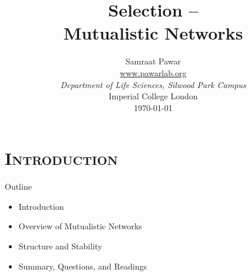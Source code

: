 





{
\begin{frame}[plain]

  \vspace{100pt}
  \title{\bf Selection -- \\Mutualistic Networks}

\author{
	Samraat Pawar\\
	\vspace{5pt}
	\url{www.pawarlab.org}\\
	\vspace{5pt}
	{\it  Department of Life Sciences, Silwood Park Campus}\\
Imperial College London\\
  \vspace{5pt}
\today
}
 
\titlepage
\date{} 

\end{frame}
}

\section{\scshape Introduction}

\begin{frame}{Outline}
  \begin{itemize}\setlength{\itemindent}{0em}\itemsep12pt

    \item Introduction

    \item Overview of Mutualistic Networks

    \item Structure and Stability
    
    \item Summary, Questions, and Readings

  \end{itemize}  

\end{frame}


